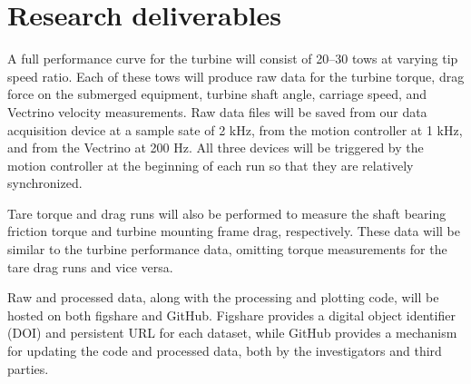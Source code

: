 \documentclass{article}
\begin{document}
\section{Research deliverables}

A full performance curve for the turbine will consist of 20--30 tows at varying
tip speed ratio. Each of these tows will produce raw data for the turbine
torque, drag force on the submerged equipment, turbine shaft angle, carriage
speed, and Vectrino velocity measurements. Raw data files will be saved from our
data acquisition device at a sample sate of 2 kHz, from the motion controller at
1 kHz, and from the Vectrino at 200 Hz. All three devices will be triggered by
the motion controller at the beginning of each run so that they are relatively
synchronized.

Tare torque and drag runs will also be performed to measure the shaft bearing
friction torque and turbine mounting frame drag, respectively. These data will
be similar to the turbine performance data, omitting torque measurements for the
tare drag runs and vice versa.

Raw and processed data, along with the processing and plotting code, will be
hosted on both figshare and GitHub. Figshare provides a digital object
identifier (DOI) and persistent URL for each dataset, while GitHub provides a
mechanism for updating the code and processed data, both by the investigators
and third parties.




\end{document}
